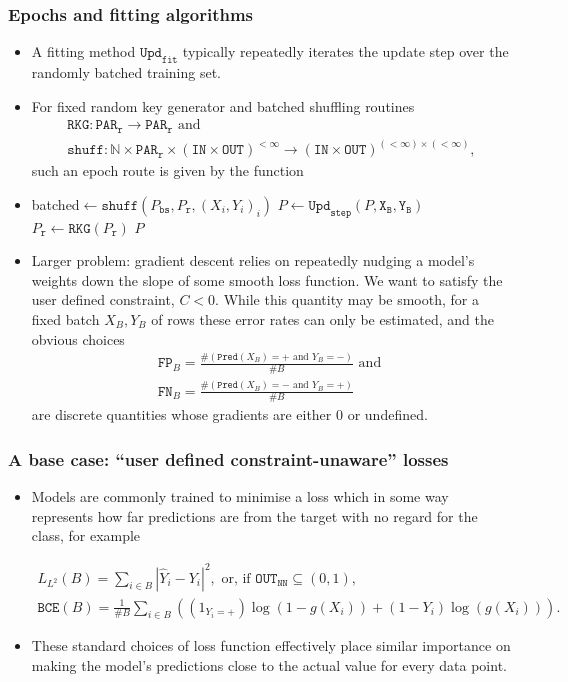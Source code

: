 \documentclass{beamer}
\newcommand{\IN}{{\texttt{IN}}}
\newcommand{\OUT}{{\texttt{OUT}}}
\newcommand{\PAR}{{\texttt{PAR}}}
\newcommand{\BS}{{P_{\texttt{bs}}}}
\newcommand{\RAND}{{\texttt{r}}}
\newcommand{\SHUFF}{{\texttt{shuff}}}
\newcommand{\RKG}{{\texttt{RKG}}}
\newcommand{\PRED}{{\texttt{Pred}}}
\newcommand{\YP}{{\hat Y}}
\newcommand{\UPDSTEP}{{\texttt{Upd}_{\texttt{step}}}}
\newcommand{\UPDEP}{{\texttt{Upd}_{\texttt{epoch}}}}
\newcommand{\UPDFIT}{{\texttt{Upd}_{\texttt{fit}}}}
\newcommand{\XB}{{\texttt{X}_{\texttt{B}}}}
\newcommand{\YB}{{\texttt{Y}_{\texttt{B}}}}
\newcommand{\FPB}{{\texttt{FP}_B}}
\newcommand{\FNB}{{\texttt{FN}_B}}
\begin{document}
\begin{frame}
\frametitle{Epochs and fitting algorithms}
\begin{itemize}
\item
A fitting method $\UPDFIT$ typically repeatedly iterates the update step over the randomly batched training set.
\item
   For fixed random key generator and batched shuffling routines
    \begin{gather*}
      \RKG:\PAR_\RAND\rightarrow\PAR_\RAND\text{ and}\\
      \SHUFF:\mathbb N\times\PAR_\RAND\times\left(\IN\times\OUT\right)^{<\infty}\rightarrow\left(\IN\times\OUT\right)^{(<\infty)\times(<\infty)},
    \end{gather*}
  such an epoch route is given by the function
\item
\begin{algorithmic}[0]
  \Function{$\UPDEP$}{$P$,$X$,$Y$}
  \State batched$\gets\SHUFF(\BS,P_\RAND,(X_i,Y_i)_i)$
  \ForAll{$(\XB,\YB)\in$ batched}
  \State $P\gets\UPDSTEP(P,\XB,\YB)$
  \EndFor
  \State $P_\RAND\gets\RKG(P_\RAND)$
  \State\Return $P$
  \EndFunction
\end{algorithmic}
\end{itemize}
\end{frame}
\begin{frame}
\begin{itemize}
\item
Larger problem: gradient descent relies on repeatedly nudging a model's weights down the slope of some smooth loss function.
We want to satisfy the user defined constraint, $C<0$.
While this quantity may be smooth, for a fixed batch $X_B,Y_B$ of rows these error rates can only be estimated, and the obvious choices
\begin{gather*}
\FPB=\frac{\#\left(\PRED(X_B)=+\text{ and }Y_B=-\right)}{\#B}\text{ and }\\
\FNB=\frac{\#\left(\PRED(X_B)=-\text{ and }Y_B=+\right)}{\#B}
\end{gather*}
are discrete quantities whose gradients are either $0$ or undefined.
\end{itemize}
\end{frame}
\begin{frame}
\frametitle{A base case: ``user defined constraint-unaware'' losses}
\begin{itemize}
\item
Models are commonly trained to minimise a loss which in some way represents how far predictions are from the target with no regard for the class, for example

\begin{gather*}
  L_{L^2}(B)=\sum_{i\in B} |\YP_i-Y_i|^2,\text{ or, if }\OUT_{\texttt{NN}}\subseteq(0,1),\\
  \texttt{BCE}(B)=\tfrac1{\#B}\sum_{i\in B}\left((1_{Y_i=+})\log(1-g(X_i))+(1-Y_i)\log(g(X_i))\right).
\end{gather*}
\item
These standard choices of loss function effectively place similar importance on making the model's predictions close to the actual value for every data point.
\end{itemize}
\end{frame}
\end{document}
